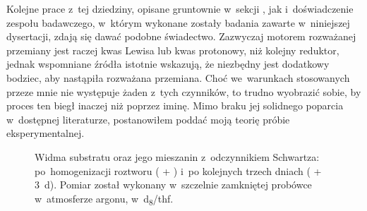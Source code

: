 Kolejne prace z~tej dziedziny, opisane gruntownie w~sekcji ,
  jak i~doświadczenie zespołu badawczego, w~którym wykonane zostały badania zawarte
  w~niniejszej dysertacji, zdają się dawać podobne świadectwo.
Zazwyczaj motorem rozważanej przemiany jest raczej kwas Lewisa lub kwas protonowy,
  niż kolejny reduktor, jednak wspomniane źródła istotnie wskazują,
  że niezbędny jest dodatkowy bodziec, aby nastąpiła rozważana przemiana.
Choć we~warunkach stosowanych przeze mnie nie występuje żaden z~tych czynników, to trudno wyobrazić sobie, by proces ten biegł inaczej niż poprzez iminę.
Mimo braku jej solidnego poparcia w~dostępnej literaturze, postanowiłem poddać moją teorię
  próbie eksperymentalnej.

\begin{figure}
  
  \caption{
    Widma \NMR*{} substratu  oraz jego mieszanin z~odczynnikiem Schwartza:
      po~homogenizacji roztworu ( + \schwartz{}) i~po kolejnych trzech dniach
      ( + \schwartz{} \SI{3}{\day}).
    Pomiar został wykonany w~szczelnie zamkniętej probówce w~atmosferze argonu,
      w~d\textsubscript{8}\-/\acrshort{thf}.
  }\label{fig:nmr-imine-trace}
\end{figure}

\begin{marginfigure}[-17.5em]
  
  \caption{
    Zbliżenie na~dublet widoczny na~\protect\cref{fig:nmr-imine-trace}, będący najpewniej
      sygnałem pochodzącym od~iminowego protonu, zaznaczonego kolorem pomarańczowym
      na~\protect\cref{sch:mechanism-our} (struktura~).
  }\label{fig:nmr-imine-expand}
\end{marginfigure}


 